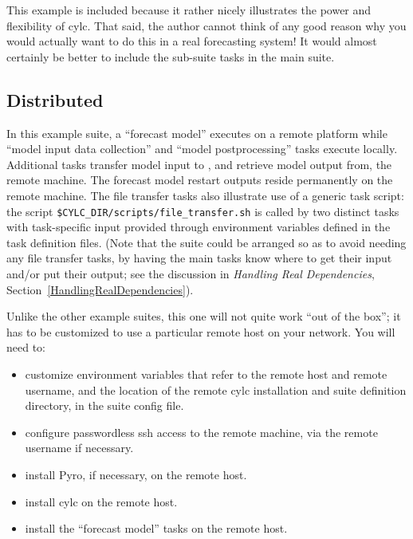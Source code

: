 \documentclass[11pt,a4paper]{article}
\begin{document}
This example is included because it rather nicely illustrates the power
and flexibility of cylc. That said, the author cannot think of any good
reason why you would actually want to do this in a real forecasting
system! It would almost certainly be better to include the sub-suite
tasks in the main suite.


\subsection{Distributed}
\label{Distributed}

In this example suite, a ``forecast model'' executes on a remote
platform while ``model input data collection'' and ``model
postprocessing'' tasks execute locally. Additional tasks transfer model
input to , and retrieve model output from, the remote machine. The
forecast model restart outputs reside permanently on the remote machine.
The file transfer tasks also illustrate use of a generic task script:
the script \lstinline=$CYLC_DIR/scripts/file_transfer.sh= is called by
two distinct tasks with task-specific input provided through environment
variables defined in the task definition files.  (Note that the suite
could be arranged so as to avoid needing any file transfer tasks, by
having the main tasks know where to get their input and/or put their
output; see the discussion in {\em Handling Real Dependencies},
Section~\ref{HandlingRealDependencies}).

Unlike the other example suites, this one will not quite work ``out of
the box''; it has to be customized to use a particular remote host on
your network. You will need to:

\begin{itemize}

    \item customize environment variables that refer to the remote 
        host and remote username, and the location of the remote 
        cylc installation and suite definition directory, in the suite
        config file. 

    \item configure passwordless ssh access to the remote machine,
        via the remote username if necessary.

    \item install Pyro, if necessary, on the remote host.

    \item install cylc on the remote host.

    \item install the ``forecast model'' tasks on the remote host.

\end{itemize}
\end{document}
